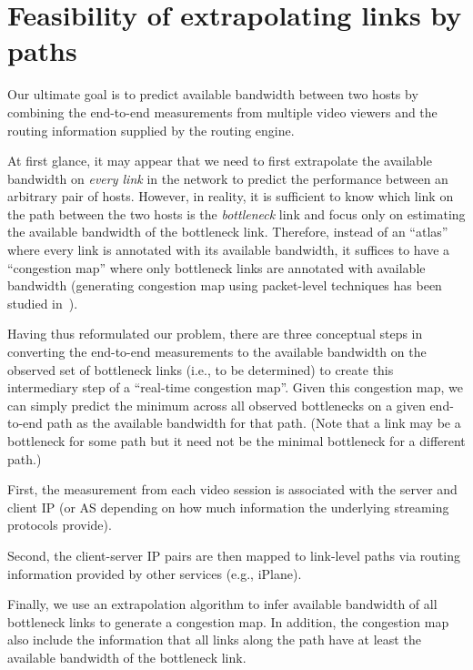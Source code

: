 \section{Feasibility of extrapolating links by paths}
\label{sec:ideas}

Our ultimate goal is to predict available bandwidth between two hosts by combining the 
end-to-end measurements from multiple video viewers and the
 routing information supplied by the routing engine. 


At first glance, it may appear that we need to  first extrapolate the available
bandwidth on {\em every link} in the network to predict the performance between
an arbitrary pair of  hosts.  However, in reality, it is sufficient to know
which link on the path between the two hosts is the {\em bottleneck} link and
focus only on estimating the available bandwidth of the bottleneck link.
Therefore, instead of an ``atlas'' where every link is annotated with its
available bandwidth, it suffices to have a  ``congestion map'' where only
bottleneck links are annotated with available bandwidth (generating congestion map using packet-level techniques has been studied in~\cite{dinu2011inferring}).  


 Having thus reformulated our problem, there are three conceptual steps in converting the end-to-end measurements to
the available bandwidth on the observed set of bottleneck links (i.e., to be determined) to create this
 intermediary step of a ``real-time congestion map''. Given 
 this congestion map, we can simply predict the minimum 
across all observed bottlenecks on a given end-to-end path   as the available bandwidth for that path.
 (Note that  a link may be a bottleneck for some path but it need not be the minimal bottleneck 
 for a different path.)


\begin{packeditemize}

	\item First, the  measurement from each video session is associated with the server and client IP (or AS depending on how much information the underlying streaming protocols provide). 

	\item Second, the client-server IP pairs are then mapped to link-level paths via routing information provided by other services (e.g., iPlane).

	\item Finally, we use an extrapolation algorithm to infer available bandwidth of all bottleneck links to generate a congestion map. In addition, the congestion map also include the information that all links along the path have at least the available bandwidth of the bottleneck link.

\end{packeditemize}


